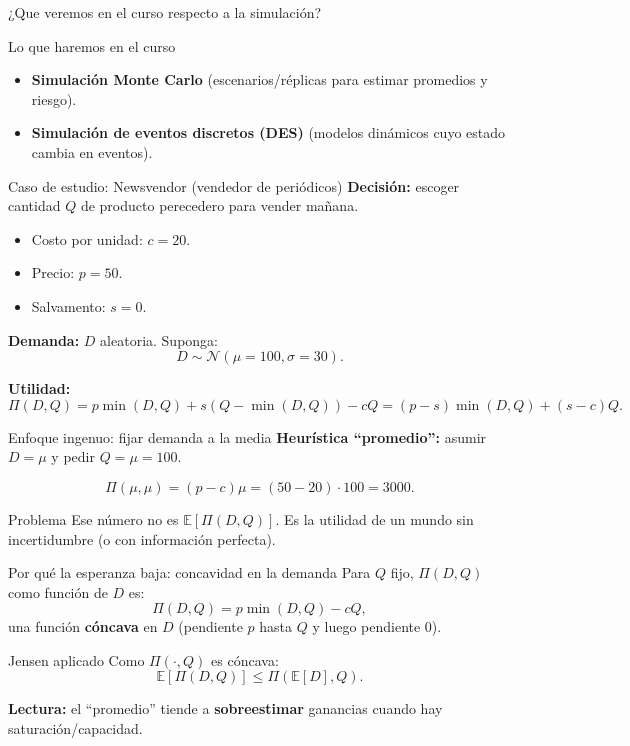 \documentclass[aspectratio=1610, 9pt]{beamer}
\begin{document}
\begin{frame}{¿Que veremos en el curso respecto a la simulación?}
\begin{block}{Lo que haremos en el curso}
\begin{itemize}
  \item \textbf{Simulación Monte Carlo} (escenarios/réplicas para estimar promedios y riesgo).
  \item \textbf{Simulación de eventos discretos (DES)} (modelos dinámicos cuyo estado cambia en eventos).
\end{itemize}
\end{block}
\end{frame}




\begin{frame}{Caso de estudio: Newsvendor (vendedor de periódicos)}
\textbf{Decisión:} escoger cantidad $Q$ de producto perecedero para vender mañana.

\begin{itemize}
  \item Costo por unidad: $c=20$.
  \item Precio: $p=50$.
  \item Salvamento: $s=0$.
\end{itemize}

\textbf{Demanda:} $D$ aleatoria. Suponga:
\[
D \sim \mathcal N(\mu=100,\sigma=30).
\]

\medskip
\textbf{Utilidad:}
\[
\Pi(D,Q) = p\min(D,Q) + s(Q-\min(D,Q)) - cQ
= (p-s)\min(D,Q) + (s-c)Q.
\]
\end{frame}

\begin{frame}{Enfoque ingenuo: fijar demanda a la media}
\textbf{Heurística ``promedio'':} asumir $D=\mu$ y pedir $Q=\mu=100$.

\[
\Pi(\mu,\mu) = (p-c)\mu = (50-20)\cdot 100 = 3000.
\]

\begin{alertblock}{Problema}
Ese número no es $\mathbb E[\Pi(D,Q)]$. Es la utilidad de un mundo sin incertidumbre (o con información perfecta).
\end{alertblock}
\end{frame}

\begin{frame}{Por qué la esperanza baja: concavidad en la demanda}
Para $Q$ fijo, $\Pi(D,Q)$ como función de $D$ es:
\[
\Pi(D,Q)=p\min(D,Q)-cQ,
\]
una función \textbf{cóncava} en $D$ (pendiente $p$ hasta $Q$ y luego pendiente $0$).

\begin{block}{Jensen aplicado}
Como $\Pi(\cdot,Q)$ es cóncava:
\[
\mathbb E[\Pi(D,Q)] \le \Pi(\mathbb E[D],Q).
\]
\end{block}

\textbf{Lectura:} el ``promedio'' tiende a \textbf{sobreestimar} ganancias cuando hay saturación/capacidad.
\end{frame}
\end{document}
